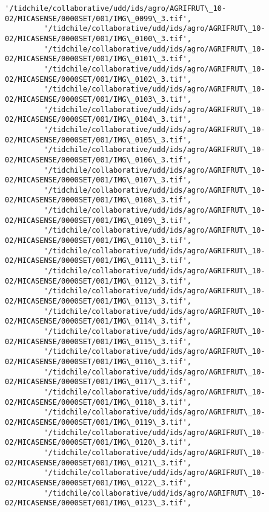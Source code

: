 \documentclass[11pt]{article}
\begin{document}
\begin{Verbatim}[commandchars=\\\{\}]
         '/tidchile/collaborative/udd/ids/agro/AGRIFRUT\_10-02/MICASENSE/0000SET/001/IMG\_0099\_3.tif',
         '/tidchile/collaborative/udd/ids/agro/AGRIFRUT\_10-02/MICASENSE/0000SET/001/IMG\_0100\_3.tif',
         '/tidchile/collaborative/udd/ids/agro/AGRIFRUT\_10-02/MICASENSE/0000SET/001/IMG\_0101\_3.tif',
         '/tidchile/collaborative/udd/ids/agro/AGRIFRUT\_10-02/MICASENSE/0000SET/001/IMG\_0102\_3.tif',
         '/tidchile/collaborative/udd/ids/agro/AGRIFRUT\_10-02/MICASENSE/0000SET/001/IMG\_0103\_3.tif',
         '/tidchile/collaborative/udd/ids/agro/AGRIFRUT\_10-02/MICASENSE/0000SET/001/IMG\_0104\_3.tif',
         '/tidchile/collaborative/udd/ids/agro/AGRIFRUT\_10-02/MICASENSE/0000SET/001/IMG\_0105\_3.tif',
         '/tidchile/collaborative/udd/ids/agro/AGRIFRUT\_10-02/MICASENSE/0000SET/001/IMG\_0106\_3.tif',
         '/tidchile/collaborative/udd/ids/agro/AGRIFRUT\_10-02/MICASENSE/0000SET/001/IMG\_0107\_3.tif',
         '/tidchile/collaborative/udd/ids/agro/AGRIFRUT\_10-02/MICASENSE/0000SET/001/IMG\_0108\_3.tif',
         '/tidchile/collaborative/udd/ids/agro/AGRIFRUT\_10-02/MICASENSE/0000SET/001/IMG\_0109\_3.tif',
         '/tidchile/collaborative/udd/ids/agro/AGRIFRUT\_10-02/MICASENSE/0000SET/001/IMG\_0110\_3.tif',
         '/tidchile/collaborative/udd/ids/agro/AGRIFRUT\_10-02/MICASENSE/0000SET/001/IMG\_0111\_3.tif',
         '/tidchile/collaborative/udd/ids/agro/AGRIFRUT\_10-02/MICASENSE/0000SET/001/IMG\_0112\_3.tif',
         '/tidchile/collaborative/udd/ids/agro/AGRIFRUT\_10-02/MICASENSE/0000SET/001/IMG\_0113\_3.tif',
         '/tidchile/collaborative/udd/ids/agro/AGRIFRUT\_10-02/MICASENSE/0000SET/001/IMG\_0114\_3.tif',
         '/tidchile/collaborative/udd/ids/agro/AGRIFRUT\_10-02/MICASENSE/0000SET/001/IMG\_0115\_3.tif',
         '/tidchile/collaborative/udd/ids/agro/AGRIFRUT\_10-02/MICASENSE/0000SET/001/IMG\_0116\_3.tif',
         '/tidchile/collaborative/udd/ids/agro/AGRIFRUT\_10-02/MICASENSE/0000SET/001/IMG\_0117\_3.tif',
         '/tidchile/collaborative/udd/ids/agro/AGRIFRUT\_10-02/MICASENSE/0000SET/001/IMG\_0118\_3.tif',
         '/tidchile/collaborative/udd/ids/agro/AGRIFRUT\_10-02/MICASENSE/0000SET/001/IMG\_0119\_3.tif',
         '/tidchile/collaborative/udd/ids/agro/AGRIFRUT\_10-02/MICASENSE/0000SET/001/IMG\_0120\_3.tif',
         '/tidchile/collaborative/udd/ids/agro/AGRIFRUT\_10-02/MICASENSE/0000SET/001/IMG\_0121\_3.tif',
         '/tidchile/collaborative/udd/ids/agro/AGRIFRUT\_10-02/MICASENSE/0000SET/001/IMG\_0122\_3.tif',
         '/tidchile/collaborative/udd/ids/agro/AGRIFRUT\_10-02/MICASENSE/0000SET/001/IMG\_0123\_3.tif',

\end{Verbatim}
\end{document}
